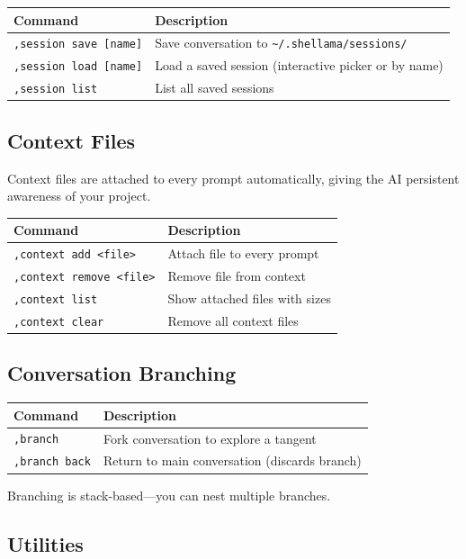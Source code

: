 \documentclass[11pt,a4paper]{article}
\begin{document}
\begin{longtable}{p{5cm}p{8.5cm}}
\toprule
\textbf{Command} & \textbf{Description} \\
\midrule
\texttt{,session save [name]} & Save conversation to \texttt{\~{}/.shellama/sessions/} \\
\texttt{,session load [name]} & Load a saved session (interactive picker or by name) \\
\texttt{,session list} & List all saved sessions \\
\bottomrule
\end{longtable}

\subsection{Context Files}

Context files are attached to every prompt automatically, giving the AI persistent awareness of your project.

\begin{longtable}{p{5cm}p{8.5cm}}
\toprule
\textbf{Command} & \textbf{Description} \\
\midrule
\texttt{,context add <file>} & Attach file to every prompt \\
\texttt{,context remove <file>} & Remove file from context \\
\texttt{,context list} & Show attached files with sizes \\
\texttt{,context clear} & Remove all context files \\
\bottomrule
\end{longtable}

\subsection{Conversation Branching}

\begin{longtable}{p{4.5cm}p{9cm}}
\toprule
\textbf{Command} & \textbf{Description} \\
\midrule
\texttt{,branch} & Fork conversation to explore a tangent \\
\texttt{,branch back} & Return to main conversation (discards branch) \\
\bottomrule
\end{longtable}

Branching is stack-based---you can nest multiple branches.

\subsection{Utilities}
\end{document}

